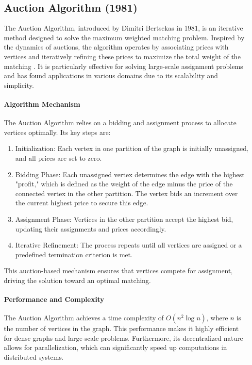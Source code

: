 \subsection*{Auction Algorithm (1981)}

The Auction Algorithm, introduced by Dimitri Bertsekas in 1981, is an iterative method designed to solve the maximum weighted matching problem. Inspired by the dynamics of auctions, the algorithm operates by associating prices with vertices and iteratively refining these prices to maximize the total weight of the matching \cite{bertsekas1981auction}. It is particularly effective for solving large-scale assignment problems and has found applications in various domains due to its scalability and simplicity.

\paragraph{Algorithm Mechanism}
The Auction Algorithm relies on a bidding and assignment process to allocate vertices optimally. Its key steps are:
\begin{enumerate}
    \item Initialization: Each vertex in one partition of the graph is initially unassigned, and all prices are set to zero.
    \item Bidding Phase: Each unassigned vertex determines the edge with the highest "profit," which is defined as the weight of the edge minus the price of the connected vertex in the other partition. The vertex bids an increment over the current highest price to secure this edge.
    \item Assignment Phase: Vertices in the other partition accept the highest bid, updating their assignments and prices accordingly.
    \item Iterative Refinement: The process repeats until all vertices are assigned or a predefined termination criterion is met.
\end{enumerate}

This auction-based mechanism ensures that vertices compete for assignment, driving the solution toward an optimal matching.

\paragraph{Performance and Complexity}
The Auction Algorithm achieves a time complexity of \(O(n^2 \log n)\), where \(n\) is the number of vertices in the graph. This performance makes it highly efficient for dense graphs and large-scale problems. Furthermore, its decentralized nature allows for parallelization, which can significantly speed up computations in distributed systems.


